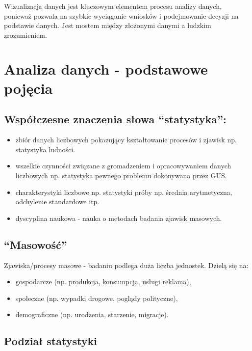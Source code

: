 \documentclass[
  polish,
  letterpaper,
  DIV=11,
  numbers=noendperiod]{scrreprt}
\providecommand{\tightlist}{%
  \setlength{\itemsep}{0pt}\setlength{\parskip}{0pt}}
\begin{document}
Wizualizacja danych jest kluczowym elementem procesu analizy danych,
ponieważ pozwala na szybkie wyciąganie wniosków i podejmowanie decyzji
na podstawie danych. Jest mostem między złożonymi danymi a ludzkim
zrozumieniem.

\section{Analiza danych - podstawowe
pojęcia}\label{analiza-danych---podstawowe-pojux119cia}

\subsection{Współczesne znaczenia słowa
``statystyka'':}\label{wspuxf3ux142czesne-znaczenia-sux142owa-statystyka}

\begin{itemize}
\tightlist
\item
  zbiór danych liczbowych pokazujący kształtowanie procesów i zjawisk
  np. statystyka ludności.
\item
  wszelkie czynności związane z gromadzeniem i opracowywaniem danych
  liczbowych np. statystyka pewnego problemu dokonywana przez GUS.
\item
  charakterystyki liczbowe np. statystyki próby np. średnia
  arytmetyczna, odchylenie standardowe itp.
\item
  dyscyplina naukowa - nauka o metodach badania zjawisk masowych.
\end{itemize}

\subsection{``Masowość''}\label{masowoux15bux107}

Zjawiska/procesy masowe - badaniu podlega duża liczba jednostek. Dzielą
się na:

\begin{itemize}
\tightlist
\item
  gospodarcze (np. produkcja, konsumpcja, usługi reklama),
\item
  społeczne (np. wypadki drogowe, poglądy polityczne),
\item
  demograficzne (np. urodzenia, starzenie, migracje).
\end{itemize}

\subsection{Podział statystyki}\label{podziaux142-statystyki}
\end{document}
